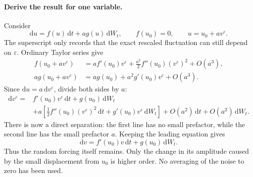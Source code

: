 \documentclass{article}
\begin{document}
\paragraph{Derive the result for one variable.}
Consider
\begin{equation}
    \mathrm du=f(u)\,\mathrm dt+a g(u)\,\mathrm dW_t,\qquad f(u_0)=0,
    \qquad u=u_0+a v^\varepsilon.
\end{equation}
The superscript only records that the exact rescaled fluctuation can still depend on $\varepsilon$. Ordinary Taylor series give
\begin{align}
    f(u_0+a v^\varepsilon)
    &=a f'(u_0)v^\varepsilon+\frac{a^2}{2}f''(u_0)(v^\varepsilon)^2+O(a^3),\\
    a g(u_0+a v^\varepsilon)
    &=a g(u_0)+a^2 g'(u_0)v^\varepsilon+O(a^3).
\end{align}
Since $\mathrm du=a\,\mathrm dv^\varepsilon$, divide both sides by $a$:
\begin{align}
    \mathrm dv^\varepsilon={}&f'(u_0)v^\varepsilon\,\mathrm dt+g(u_0)\,\mathrm dW_t\nonumber\\
    &+a\left[\frac12f''(u_0)(v^\varepsilon)^2\,\mathrm dt
    +g'(u_0)v^\varepsilon\,\mathrm dW_t\right]
    +O(a^2)\,\mathrm dt+O(a^2)\,\mathrm dW_t.
    \label{eq:appElementaryScalar}
\end{align}
There is now a direct separation: the first line has no small prefactor, while the second line has the small prefactor $a$. Keeping the leading equation gives
\begin{equation}
    \boxed{\mathrm dv=f'(u_0)v\,\mathrm dt+g(u_0)\,\mathrm dW_t.}
\end{equation}
Thus the random forcing itself remains. Only the change in its amplitude caused by the small displacement from $u_0$ is higher order. No averaging of the noise to zero has been used.
\end{document}

